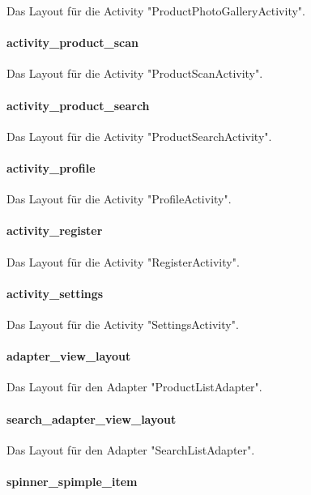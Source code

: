 \documentclass{scrartcl}
\begin{document}
\noindent Das Layout für die Activity "ProductPhotoGalleryActivity". 

\paragraph{activity\_product\_scan} \mbox{} 

\noindent Das Layout für die Activity "ProductScanActivity". 

\paragraph{activity\_product\_search} \mbox{} 

\noindent Das Layout für die Activity "ProductSearchActivity". 

\paragraph{activity\_profile} \mbox{} 

\noindent Das Layout für die Activity "ProfileActivity". 

\paragraph{activity\_register} \mbox{} 

\noindent Das Layout für die Activity "RegisterActivity". 

\paragraph{activity\_settings} \mbox{} 

\noindent Das Layout für die Activity "SettingsActivity". 

\paragraph{adapter\_view\_layout} \mbox{} 

\noindent Das Layout für den Adapter "ProductListAdapter".

\paragraph{search\_adapter\_view\_layout} \mbox{} 

\noindent Das Layout für den Adapter "SearchListAdapter". 

\paragraph{spinner\_spimple\_item} \mbox{} 
\end{document}
